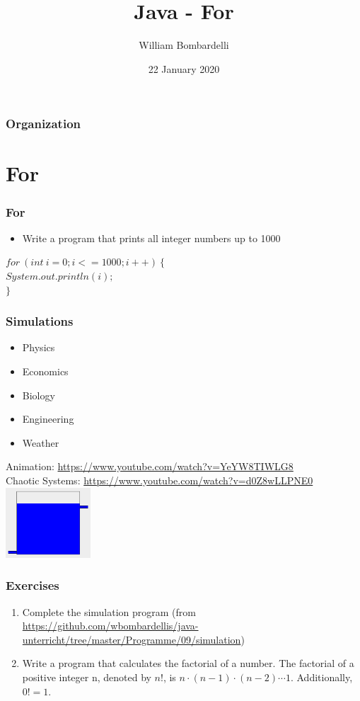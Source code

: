 \documentclass{beamer}
\title[Java]{Java - For}
\author[W. Bombardelli]{William Bombardelli}
\institute[Schweizerschule Mexiko]
{
	\vskip 12pt
	Schweizerschule Mexiko, Ciudad de México, Mexico \\
	\texttt{\url{https://github.com/wbombardellis/java-unterricht}}
}
\date{22 January 2020}
\newcommand{\cindent}{\hskip20pt}
\begin{document}
	\begin{frame}
		\titlepage
	\end{frame}
	
	\begin{frame}
		\frametitle{Organization}
		\tableofcontents
	\end{frame}

	\section{For}
	\begin{frame}
		\frametitle{For}
		\begin{itemize}
			\item Write a program that prints all integer numbers up to 1000
		\end{itemize}
		\pause
		$for\ (int\ i = 0; i <= 1000; i++)\ \{$\\
			\cindent $System.out.println(i);$\\
		$\}$\\
	\end{frame}

	\begin{frame}
		\frametitle{Simulations}
		\begin{itemize}
			\item Physics
			\item Economics
			\item Biology
			\item Engineering
			\item Weather
		\end{itemize}
		\pause
		Animation: \url{https://www.youtube.com/watch?v=YeYW8TIWLG8}\\
		Chaotic Systems: \url{https://www.youtube.com/watch?v=d0Z8wLLPNE0}\\
		\pause
		\centering
		\includegraphics[width=90pt]{tank.png}
	\end{frame}

	\begin{frame}
		\frametitle{Exercises}
		\begin{enumerate}
			\item Complete the simulation program (from \url{https://github.com/wbombardellis/java-unterricht/tree/master/Programme/09/simulation})
			\pause
			\item Write a program that calculates the factorial of a number. The factorial of a positive integer n, denoted by $n!$, is $n \cdot (n-1) \cdot (n-2) \cdots 1$. Additionally, $0! = 1$.
		\end{enumerate}
	\end{frame}
\end{document}
